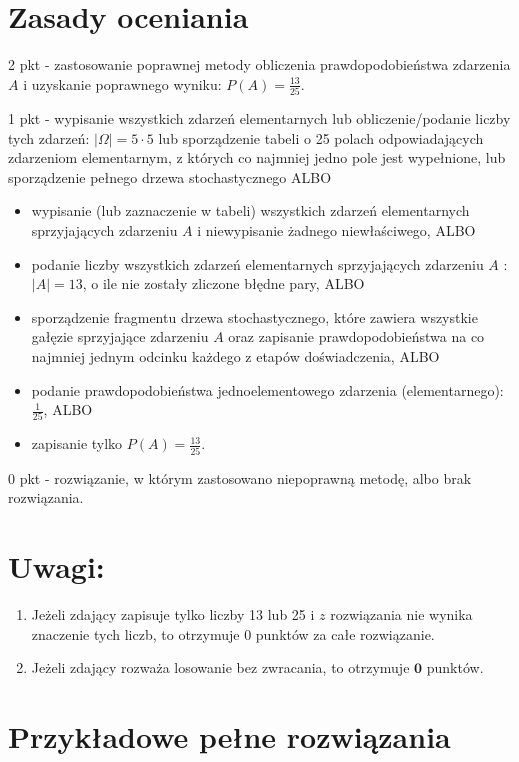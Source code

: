 \documentclass[10pt]{article}
\begin{document}
\section*{Zasady oceniania}
2 pkt - zastosowanie poprawnej metody obliczenia prawdopodobieństwa zdarzenia $A$ i uzyskanie poprawnego wyniku: $P(A)=\frac{13}{25}$.

1 pkt - wypisanie wszystkich zdarzeń elementarnych lub obliczenie/podanie liczby tych zdarzeń: $|\Omega|=5 \cdot 5$ lub sporządzenie tabeli o 25 polach odpowiadających zdarzeniom elementarnym, z których co najmniej jedno pole jest wypełnione, lub sporządzenie pełnego drzewa stochastycznego ALBO

\begin{itemize}
  \item wypisanie (lub zaznaczenie w tabeli) wszystkich zdarzeń elementarnych sprzyjających zdarzeniu $A$ i niewypisanie żadnego niewłaściwego, ALBO
  \item podanie liczby wszystkich zdarzeń elementarnych sprzyjających zdarzeniu $A$ : $|A|=13$, o ile nie zostały zliczone błędne pary, ALBO
  \item sporządzenie fragmentu drzewa stochastycznego, które zawiera wszystkie gałęzie sprzyjające zdarzeniu $A$ oraz zapisanie prawdopodobieństwa na co najmniej jednym odcinku każdego z etapów doświadczenia, ALBO
  \item podanie prawdopodobieństwa jednoelementowego zdarzenia (elementarnego): $\frac{1}{25}$, ALBO
  \item zapisanie tylko $P(A)=\frac{13}{25}$.
\end{itemize}

0 pkt - rozwiązanie, w którym zastosowano niepoprawną metodę, albo brak rozwiązania.

\section*{Uwagi:}
\begin{enumerate}
  \item Jeżeli zdający zapisuje tylko liczby 13 lub 25 i $z$ rozwiązania nie wynika znaczenie tych liczb, to otrzymuje 0 punktów za całe rozwiązanie.
  \item Jeżeli zdający rozważa losowanie bez zwracania, to otrzymuje $\mathbf{0}$ punktów.
\end{enumerate}

\section*{Przykładowe pełne rozwiązania}
\end{document}
